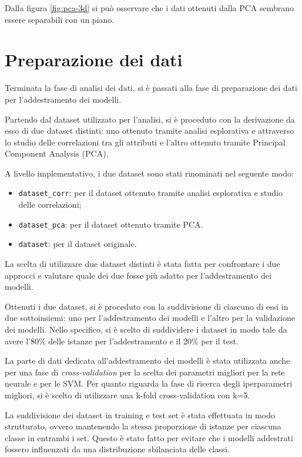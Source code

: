 Dalla figura \ref{fig:pca-3d} si può osservare che i dati ottenuti dalla PCA
sembrano essere separabili con un piano.
\section{Preparazione dei dati} \label{sec:preparazione_dei_dati}
Terminata la fase di analisi dei dati, si è passati alla fase di preparazione
dei dati per l'addestramento dei modelli.

Partendo dal dataset utilizzato per l'analisi, si è proceduto con la derivazione
da esso di due dataset distinti: uno ottenuto tramite analisi esplorativa e
attraverso lo studio delle correlazioni tra gli attributi e l'altro ottenuto
tramite Principal Component Analysis (PCA).

A livello implementativo, i due dataset sono stati rinominati nel seguente modo:
\begin{itemize}
      \item \texttt{dataset\_corr}: per il dataset ottenuto tramite analisi
            esplorativa e studio delle correlazioni;
      \item \texttt{dataset\_pca}: per il dataset ottenuto tramite PCA.
      \item \texttt{dataset}: per il dataset originale.
\end{itemize}

La scelta di utilizzare due dataset distinti è stata fatta per confrontare
i due approcci e valutare quale dei due fosse più adatto per l'addestramento
dei modelli.

Ottenuti i due dataset, si è proceduto con la suddivisione di ciascuno di essi
in due sottoinsiemi: uno per l'addestramento dei modelli e l'altro per la
validazione dei modelli. Nello specifico, si è scelto di suddividere i dataset
in modo tale da avere l'$80\%$ delle istanze per l'addestramento e il $20\%$ per
il test.

La parte di dati dedicata all'addestramento dei modelli è stata utilizzata anche
per una fase di \textit{cross-validation} per la scelta dei parametri migliori
per la rete neurale e per le SVM. Per quanto riguarda la fase di ricerca degli
iperparametri migliori, si è scelto di utilizzare una k-fold cross-validation
con k=5.

La suddivisione dei dataset in training e test set è stata effettuata in modo
strutturato, ovvero mantenendo la stessa proporzione di istanze per ciascuna
classe in entrambi i set. Questo è stato fatto per evitare che i modelli
addestrati fossero influenzati da una distribuzione sbilanciata delle classi.

